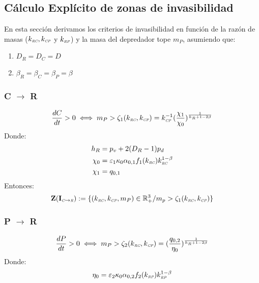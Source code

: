 \subsection{C\'alculo Expl\'icito de zonas de invasibilidad}

En esta secci\'on derivamos los criterios de invasibilidad en funci\'on de la raz\'on de masas ($k_{\textit{\tiny RC}},k_{\textit{\tiny CP}}$ y $k_{\textit{\tiny RP}}$) y la masa del depredador tope $m_P$, asumiendo que:
\begin{enumerate}
\item $D_R = D_C = D$
\item $\beta_R = \beta_C = \beta_P = \beta$
\end{enumerate}


\subsubsection{C $\to$ R}

\begin{equation}
  \frac{dC}{dt} >0 \iff  m_P > \zeta_1(k_{\textit{\tiny RC}},k_{\textit{\tiny CP}}) = k_{\textit{\tiny CP}}^{-1}(\frac{\chi_1}{\chi_0})^{\frac{1}{h_R +1 - 2\beta }}
\end{equation}
Donde:
\begin{equation}
  \begin{aligned}
    h_R &= p_v + 2(D_R - 1)p_d \\
    \chi_0 &= \varepsilon_1 \kappa_0\alpha_{0,1} f_1(k_{\textit{\tiny RC}})k_{\textit{\tiny RC}}^{1-\beta} \\
    \chi_1 &= q_{0,1} 
  \end{aligned}
\end{equation}
Entonces:
\begin{equation}
\mathbf{Z(I_{\textit{\tiny C}\to \textit{\tiny R}})} := \{ (k_{\textit{\tiny RC}},k_{\textit{\tiny CP}},m_P) \in \mathbb{R}^3_+ / m_p > \zeta_1(k_{\textit{\tiny RC}},k_{\textit{\tiny CP}}) \}
\end{equation}

\subsubsection{P $\to$ R}

\begin{equation}
  \frac{dP}{dt} >0 \iff  m_P > \zeta_2(k_{\textit{\tiny RC}},k_{\textit{\tiny CP}}) = (\frac{q_{0,2}}{\eta_0})^{\frac{1}{h_R +1 - 2\beta}}
\end{equation}
Donde:
\begin{equation}
  \begin{aligned}
    \eta_0 &= \varepsilon_2 \kappa_0\alpha_{0,2} f_2(k_{\textit{\tiny RP}})k_{\textit{\tiny RP}}^{1-\beta} \\
  \end{aligned}
\end{equation}


